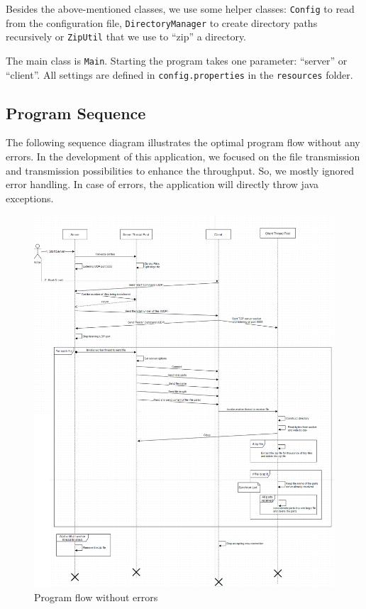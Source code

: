 \documentclass[12pt,a4paper]{article}
\begin{document}
Besides the above-mentioned classes, we use some helper classes: \lstinline!Config! to read from the configuration file, \lstinline!DirectoryManager! to create directory paths recursively or \lstinline!ZipUtil! that we use to ``zip'' a directory.

The main class is \lstinline!Main!. Starting the program takes one parameter: ``server'' or ``client''. All settings are defined in \lstinline!config.properties! in the \lstinline!resources! folder.

\subsection{Program Sequence}
The following sequence diagram illustrates the optimal program flow without any errors. In the development of this application, we focused on the file transmission and transmission possibilities to enhance the throughput. So, we mostly ignored error handling. In case of errors, the application will directly throw java exceptions. 

\begin{figure}[h!]
	\includegraphics[scale=.5]{./FileTransferApp.png}
	\caption{Program flow without errors}
\end{figure}
\end{document}
